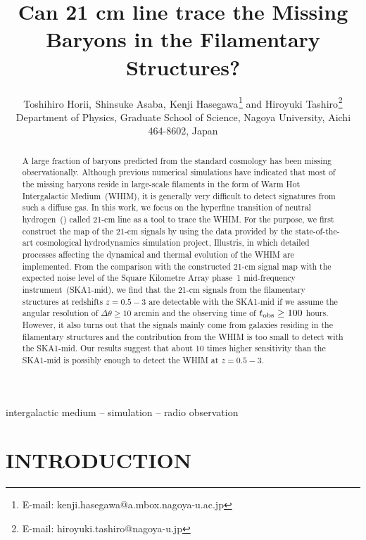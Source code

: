 \documentclass[a4paper,fleqn,usenatbib,useAMS]{mnras}
\title[Can \ion{H}{I} 21 cm line trace the Missing Baryons in the Filamentary Structures?]{Can \ion{H}{I} 21 cm line trace the Missing Baryons in the Filamentary Structures?}
\author[T. Horii et al.]{
Toshihiro Horii,$^{}$
Shinsuke Asaba,$^{}$
Kenji Hasegawa$^{}$\thanks{E-mail: kenji.hasegawa@a.mbox.nagoya-u.ac.jp}
and Hiroyuki Tashiro$^{}$\thanks{E-mail: hiroyuki.tashiro@nagoya-u.jp}
\\
$^{}$Department of Physics, Graduate School of Science, Nagoya University, Aichi 464-8602, Japan
}
\begin{document}
\pagerange{\pageref{firstpage}--\pageref{lastpage}}
\maketitle

\begin{abstract}
A large fraction of baryons predicted from the standard cosmology has been missing observationally. 
Although previous numerical simulations have indicated that most of the
missing baryons reside in large-scale filaments in the form of Warm Hot
Intergalactic Medium~(WHIM), it is generally very difficult to detect
signatures from such a diffuse gas. 
In this work, we focus on the hyperfine transition of neutral hydrogen~() called 21-cm line as a tool to trace the WHIM. 
For the purpose, we first construct the map of the 21-cm signals by
using the data provided by the state-of-the-art cosmological
hydrodynamics simulation project, Illustris, in which detailed processes affecting the dynamical and thermal evolution of the WHIM are implemented. 
From the comparison with the constructed 21-cm signal map with the
expected noise level of the Square Kilometre Array phase~1 mid-frequency instrument~(SKA1-mid), we
find that the 21-cm signals from the filamentary structures at redshifts
$z=0.5-3$ are detectable with the SKA1-mid if we assume the angular resolution of $\Delta\theta\geq10$ arcmin and the observing time of $t_{\rm obs}\geq100$ hours. 
However, it also turns out that the signals mainly come from galaxies
residing in the filamentary structures and the contribution from the WHIM is too small to detect with the SKA1-mid. 
Our results suggest that about 10 times higher sensitivity than the SKA1-mid is possibly enough to detect the WHIM at $z=0.5-3$. 
\end{abstract}

\begin{keywords}
intergalactic medium -- simulation -- radio observation 
\end{keywords}

\section{INTRODUCTION}\label{INTRODUCTION}
\end{document}
